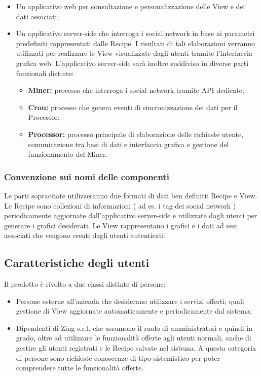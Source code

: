 \begin{itemize}
\item Un applicativo web per consultazione e personalizzazione delle View e dei dati associati;
\item Un applicativo server-side che interroga i social network in base ai parametri predefiniti rappresentati dalle Recipe. I risultati di tali elaborazioni verranno utilizzati per realizzare le View visualizzate dagli utenti tramite l'interfaccia grafica web.
  L'applicativo server-side sarà inoltre suddiviso in diverse parti funzionali distinte:
  \begin{itemize}
    \item \textbf{Miner:} processo che interroga i social network tramite API dedicate;
    \item \textbf{Cron:} processo che genera eventi di sincronizzazione dei dati per il Processor;
    \item \textbf{Processor:} processo principale di elaborazione delle richieste utente, comunicazione tra basi di dati e interfaccia grafica e gestione del funzionamento del Miner.
  \end{itemize}
\end{itemize}

\subsubsection{Convenzione sui nomi delle componenti}
Le parti sopracitate utilizzeranno due formati di dati ben definiti: Recipe e View.
Le Recipe sono collezioni di informazioni ( ad es. i tag dei social network ) periodicamente aggiornate dall'applicativo server-side e utilizzate dagli utenti per generare i grafici desiderati.
Le View rappresentano i grafici e i dati ad essi associati che vengono creati dagli utenti autenticati.

\subsection{Caratteristiche degli utenti}
Il prodotto è rivolto a due classi distinte di persone:

\begin{itemize}
  \item Persone esterne all'azienda che desiderano utilizzare i servizi offerti, quali gestione di View aggiornate automaticamente e periodicamente dal sistema;
  \item Dipendenti di Zing s.r.l. che assumono il ruolo di amministratori e quindi in grado, oltre ad utilizzare le funzionalità offerte agli utenti normali, anche di gestire gli utenti registrati e le Recipe salvate nel sistema.
  A questa categoria di persone sono richieste conoscenze di tipo sistemistico per poter comprendere tutte le funzionalità offerte.
\end{itemize}


